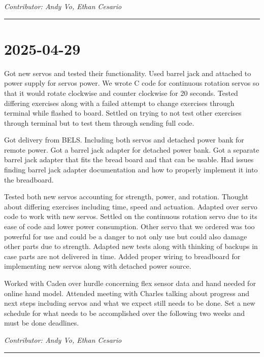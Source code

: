 \documentclass[12pt]{article}
\begin{document}
\vspace{1em}
\noindent\textit{Contributor: Andy Vo, Ethan Cesario}
\vspace{1em}
\hrule

\section*{2025-04-29}
Got new servos and tested their functionality. Used barrel jack and attached to power supply for servos power. We wrote C code for continuous rotation servos so that it would rotate clockwise and counter clockwise for 20 seconds. Tested differing exercises along with a failed attempt to change exercises through terminal while flashed to board. Settled on trying to not test other exercises through terminal but to test them through sending full code.


\vspace{1em}


Got delivery from BELS. Including both servos and detached power bank for remote power. Got a barrel jack adapter for detached power bank. Got a separate barrel jack adapter that fits the bread board and that can be usable. Had issues finding barrel jack adapter documentation and how to properly implement it into the breadboard.

\vspace{1em}

Tested both new servos accounting for strength, power, and rotation. Thought about differing exercises including time, speed and actuation. Adapted over servo code to work with new servos. Settled on the continuous rotation servo due to its ease of code and lower power consumption. Other servo that we ordered was too powerful for use and could be a danger to not only use but could also damage other parts due to strength. Adapted new tests along with thinking of backups in case parts are not delivered in time. Added proper wiring to breadboard for implementing new servos along with detached power source.

\vspace{1em}

Worked with Caden over hurdle concerning flex sensor data and hand needed for online hand model. Attended meeting with Charles talking about progress and next steps including servos and what we expect still needs to be done. Set a new schedule for what needs to be accomplished over the following two weeks and must be done deadlines.

\vspace{1em}
\noindent\textit{Contributor: Andy Vo, Ethan Cesario}
\vspace{1em}
\hrule
\end{document}
